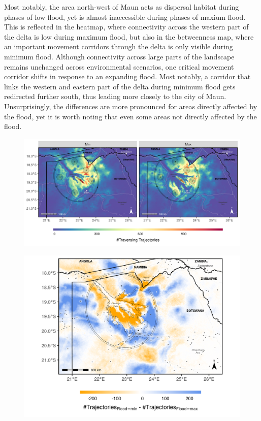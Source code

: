 \documentclass[abstract=on,10pt,a4paper,bibliography=totocnumbered]{article}
\begin{document}
 Most notably, the
area north-west of Maun acts as dispersal habitat during phases of low flood,
yet is almost inaccessible during phases of maxium flood. This is reflected in
the heatmap, where connectivity across the western part of the delta is low
during maximum flood, but also in the betweenness map, where an important
movement corridors through the delta is only visible during minimum flood.
Although connectivity across large parts of the landscape remains unchanged
across environmental scenarios, one critical movement corridor shifts in
response to an expanding flood. Most notably, a corridor that links the western
and eastern part of the delta during minimum flood gets redirected further
south, thus leading more closely to the city of Maun. Unsurprisingly, the
differences are more pronounced for areas directly affected by the flood, yet it
is worth noting that even some areas not directly affected by the flood.

\begin{figure}
  \begin{center}
  \includegraphics[width = \textwidth]{99_Heatmaps.png}
  \caption{}
  \label{Heatmaps}
  \end{center}
\end{figure}

\begin{figure}
  \begin{center}
  \includegraphics[width = \textwidth]{99_DifferenceMap.png}
  \caption{}
  \label{DifferenceHeatmaps}
  \end{center}
\end{figure}
\end{document}
